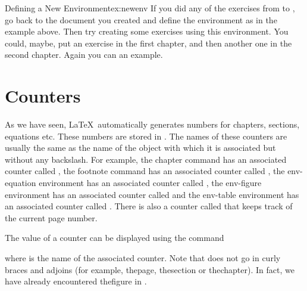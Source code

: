 \begin{exercise}{Defining a New Environment}{ex:newenv}
If you did any of the exercises from 
to , go back to the document you
created and define the  environment as in
the example above.  Then try creating some exercises using this
environment. You could, maybe, put an exercise in the first
chapter, and then another one in the second chapter.
Again you can  an example.
\end{exercise}


\chapter{Counters}
\label{ch:counters}

As we have seen, \LaTeX\ automatically generates numbers for
chapters, sections, equations etc. These numbers are stored in
. The names of these counters are usually the same
as the name of the object with which it is associated but without
any backslash. For example, the \gls{chapter} command has an associated
counter called , the \gls{footnote} command has an
associated counter called , the
\gls{env-equation} environment has an associated counter called
, the \gls{env-figure} environment has an associated counter
called  and the \gls{env-table} environment has an associated
counter called . There is also a counter called
 that keeps track of the current page number.

The value of a counter can be displayed using the command
\begin{definition}
\end{definition}%
where  is the name of the associated counter.  Note
that  does not go in curly braces and adjoins
 (for example, \gls{thepage}, \reportlinebreak\gls{thesection} or
\gls{thechapter}).   In fact, we have already encountered
\reportlinebreak\screenlinebreak\gls{thefigure} in .

